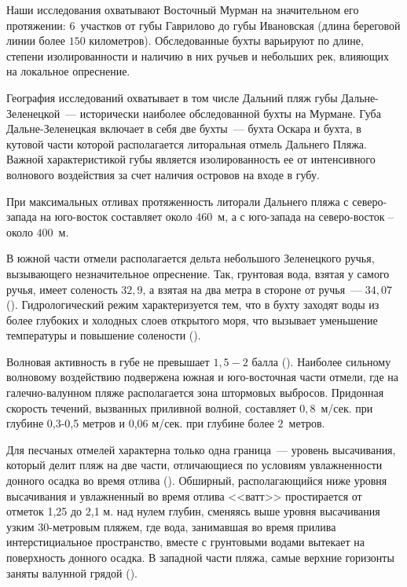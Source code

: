 Наши исследования охватывают Восточный Мурман на значительном его протяжении: $6$~участков от губы Гаврилово до губы Ивановская (длина береговой линии более $150$ километров).
Обследованные бухты варьируют по длине, степени изолированности и наличию в них ручьев и небольших рек, влияющих на локальное опреснение.


География исследований охватывает в том числе Дальний пляж губы Дальне-Зеленецкой~--- исторически наиболее обследованной бухты на Мурмане.
Губа Дальне-Зеленецкая включает в себя две бухты~--- бухта Оскара и бухта, в кутовой части которой располагается литоральная отмель Дальнего Пляжа. 
Важной характеристикой губы является изолированность ее от интенсивного волнового воздействия за счет наличия островов на входе в губу.
	
При максимальных отливах протяженность литорали Дальнего пляжа с северо-запада на юго-восток составляет около $460$~м, а с юго-запада на северо-восток -- около $400$~м. 
	
В южной части отмели располагается дельта небольшого Зеленецкого ручья, вызывающего незначительное опреснение. 
Так, грунтовая вода, взятая у самого ручья, имеет соленость $32,9$\permil, а взятая на два метра в стороне от ручья~--- $34,07$\permil (\cite{Prigorovskiy_1948}). 
Гидрологический режим характеризуется тем, что в бухту заходят воды из более глубоких и холодных слоев открытого моря, что вызывает уменьшение температуры и повышение солености (\cite{Voronkov_et_al_1948}).

Волновая активность в губе не превышает $1,5 - 2$ балла (\cite{Alexeev_1976}). 
Наиболее сильному волновому воздействию подвержена южная и юго-восточная части отмели, где на галечно-валунном пляже располагается зона штормовых выбросов.
Придонная скорость течений, вызванных приливной волной, составляет $0,8$~м/сек. при глубине 0,3-0,5 метров и 0,06 м/сек. при глубине более $2$~метров.

Для песчаных отмелей характерна только одна граница~--- уровень высачивания, который делит пляж на две части, отличающиеся по условиям увлажненности донного осадка во время отлива (\cite{Streltsov_Agarova_1978}). 
Обширный, располагающийся ниже уровня высачивания и увлажненный во время отлива <<ватт>> простирается от отметок 1,25 до 2,1 м. над нулем глубин, сменяясь выше уровня высачивания узким $30$-метровым пляжем, где вода, занимавшая во время прилива интерстициальное пространство, вместе с грунтовыми водами вытекает на поверхность донного осадка. 
В западной части пляжа, самые верхние горизонты заняты валунной грядой (\cite{Agarova_et_al_1976}). 

